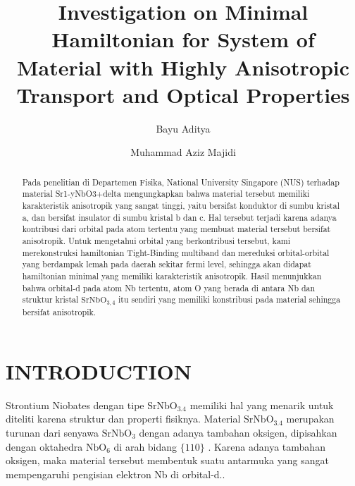 \documentclass{aip-cp}
\begin{document}
\title{Investigation on Minimal Hamiltonian for System of Material with Highly Anisotropic Transport and Optical Properties}

\author[aff1]{Bayu Aditya}
\author[aff1]{Muhammad Aziz Majidi}


\maketitle


\begin{abstract}
Pada penelitian di Departemen Fisika, National University Singapore (NUS) terhadap material Sr1-yNbO3+delta mengungkapkan bahwa material tersebut memiliki karakteristik anisotropik yang sangat tinggi, yaitu bersifat konduktor di sumbu kristal a, dan bersifat insulator di sumbu kristal b dan c. Hal tersebut terjadi karena adanya kontribusi dari orbital pada atom tertentu yang membuat material tersebut bersifat anisotropik. Untuk mengetahui orbital yang berkontribusi tersebut, kami merekonstruksi hamiltonian Tight-Binding multiband dan mereduksi orbital-orbital yang berdampak lemah pada daerah sekitar fermi level, sehingga akan didapat hamiltonian minimal yang memiliki karakteristik anisotropik. Hasil menunjukkan bahwa orbital-d pada atom Nb tertentu, atom O yang berada di antara Nb dan struktur kristal $\mathrm{SrNbO_{3,4}}$ itu sendiri yang memiliki konstribusi pada material sehingga bersifat anisotropik.
\end{abstract}

\section{INTRODUCTION}
Strontium Niobates dengan tipe $\mathrm{SrNbO_{3.4}}$ memiliki hal yang menarik untuk diteliti karena struktur dan properti fisiknya\cite{andrivo}. Material $\mathrm{SrNbO_{3.4}}$ merupakan turunan dari senyawa $\mathrm{SrNbO_{3}}$ dengan adanya tambahan oksigen, dipisahkan dengan oktahedra $\mathrm{NbO_{6}}$ di arah bidang $\{110\}$ \cite{LICHTENBERG2001,LICHTENBERG2008}. Karena adanya tambahan oksigen, maka material tersebut membentuk suatu antarmuka yang sangat mempengaruhi pengisian elektron Nb di orbital-d.\cite{chen}.
\end{document}
